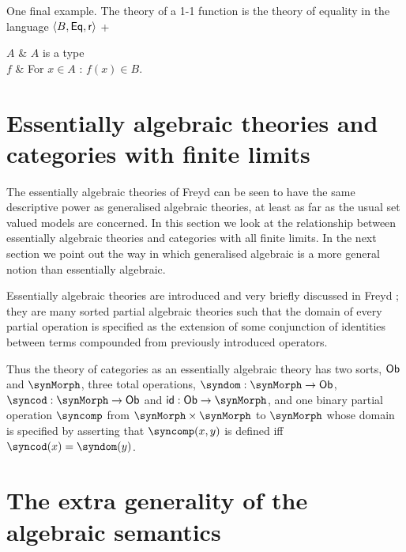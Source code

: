 One final example.
%
The theory of a 1-1 function is the theory of equality in the language $\langle B,\mathsf{Eq},\mathsf{r} \rangle$ +

\begin{theoryspec}
  $A$ & $A$ is a type \\
  $f$ & For $x \in A$ : $f(x) \in B$. \\
  \axioms
\end{theoryspec}

\section{Essentially algebraic theories and categories with finite limits} \label{sec:source-1-4}

The essentially algebraic theories of Freyd \cite{freyd:5} can be seen to have the same descriptive power as generalised algebraic theories, at least as far as the usual set valued models are concerned.
%
In this section we look at the relationship between essentially algebraic theories and categories with all finite limits.
%
In the next section we point out the way in which generalised algebraic is a more general notion than essentially algebraic.

Essentially algebraic theories are introduced and very briefly discussed in Freyd \cite{freyd:5}; they are many sorted partial algebraic theories such that the domain of every partial operation is specified as the extension of some conjunction of identities between terms compounded from previously introduced operators.

Thus the theory of categories as an essentially algebraic theory has two sorts, $\mathsf{Ob}$ and $\synMorph$,  three total operations, $\syndom : \synMorph \to \synOb$, $\syncod : \synMorph \to \synOb$ and $\synid : \synOb \to \synMorph$, and one binary partial operation $\syncomp$ from $\synMorph \times \synMorph$ to $\synMorph$ whose domain is specified by asserting that $\syncomp(x,y)$ is defined iff $\syncod(x) = \syndom(y)$.

\section{The extra generality of the algebraic semantics} \label{sec:source-1-5}

\lipsum[4]

